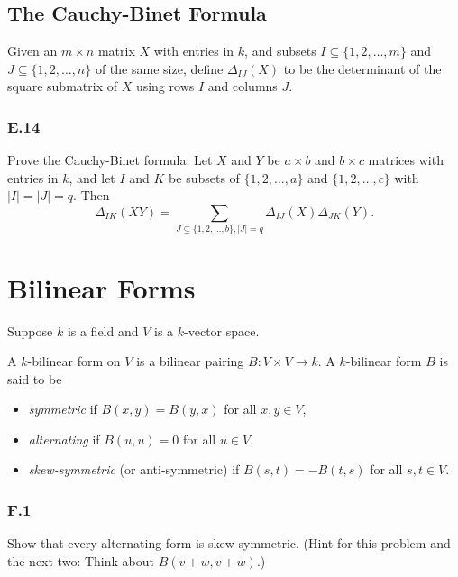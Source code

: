 \documentclass[lang=cn,11pt]{template}
\begin{document}
\section{The Cauchy-Binet Formula}

Given an \( m \times n \) matrix \( X \) with entries in \( k \), and subsets \( I \subseteq \{1, 2, \dots, m\} \) and \( J \subseteq \{1, 2, \dots, n\} \) of the same size, define \( \Delta_{IJ}(X) \) to be the determinant of the square submatrix of \( X \) using rows \( I \) and columns \( J \).

\subsection*{E.14} Prove the Cauchy-Binet formula: Let \( X \) and \( Y \) be \( a \times b \) and \( b \times c \) matrices with entries in \( k \), and let \( I \) and \( K \) be subsets of \( \{1, 2, \dots, a\} \) and \( \{1, 2, \dots, c\} \) with \( |I| = |J| = q \). Then
\[
\Delta_{IK}(XY) = \sum_{J \subseteq \{1, 2, \dots, b\}, |J| = q} \Delta_{IJ}(X) \Delta_{JK}(Y).
\]













\chapter{Bilinear Forms}

Suppose \( k \) is a field and \( V \) is a \( k \)-vector space.

\begin{definition}
A \( k \)-bilinear form on \( V \) is a bilinear pairing \( B : V \times V \to k \). A \( k \)-bilinear form \( B \) is said to be
\begin{itemize}
    \item \textit{symmetric} if \( B(x, y) = B(y, x) \) for all \( x, y \in V \),
    \item \textit{alternating} if \( B(u, u) = 0 \) for all \( u \in V \),
    \item \textit{skew-symmetric} (or anti-symmetric) if \( B(s, t) = -B(t, s) \) for all \( s, t \in V \).
\end{itemize}
\end{definition}

\subsection*{F.1} Show that every alternating form is skew-symmetric. (Hint for this problem and the next two: Think about \( B(v + w, v + w) \).)
\end{document}
